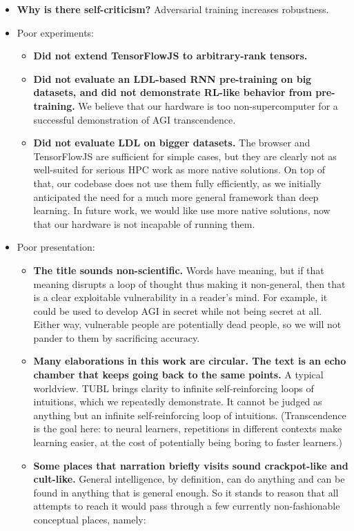 \documentclass{article}
\begin{document}
\begin{itemize}
\item \textbf{Why is there self-criticism?} Adversarial training increases robustness.
\item Poor experiments:
\begin{itemize}
\item \textbf{Did not extend TensorFlowJS to arbitrary-rank tensors.}
\item \textbf{Did not evaluate an LDL-based RNN pre-training on big datasets, and did not demonstrate RL-like behavior from pre-training.} We believe that our hardware is too non-supercomputer for a successful demonstration of AGI transcendence.
\item \textbf{Did not evaluate LDL on bigger datasets.} The browser and TensorFlowJS are sufficient for simple cases, but they are clearly not as well-suited for serious HPC work as more native solutions. On top of that, our codebase does not use them fully efficiently, as we initially anticipated the need for a much more general framework than deep learning. In future work, we would like use more native solutions, now that our hardware is not incapable of running them.
\end{itemize}
\item Poor presentation:
\begin{itemize}
\item \textbf{The title sounds non-scientific.} Words have meaning, but if that meaning disrupts a loop of thought thus making it non-general, then that is a clear exploitable vulnerability in a reader's mind. For example, it could be used to develop AGI in secret while not being secret at all. Either way, vulnerable people are potentially dead people, so we will not pander to them by sacrificing accuracy.
\item \textbf{Many elaborations in this work are circular. The text is an echo chamber that keeps going back to the same points.} A typical worldview. %
TUBL brings clarity to infinite self-reinforcing loops of intuitions, which we repeatedly demonstrate. It cannot be judged as anything but an infinite self-reinforcing loop of intuitions. (Transcendence is the goal here: to neural learners, repetitions in different contexts make learning easier, at the cost of potentially being boring to faster learners.)
\item \textbf{Some places that narration briefly visits sound crackpot-like and cult-like.} General intelligence, by definition, can do anything and can be found in anything that is general enough. So it stands to reason that all attempts to reach it would pass through a few currently non-fashionable conceptual places, namely:

\end{itemize}
\end{itemize}
\end{document}
